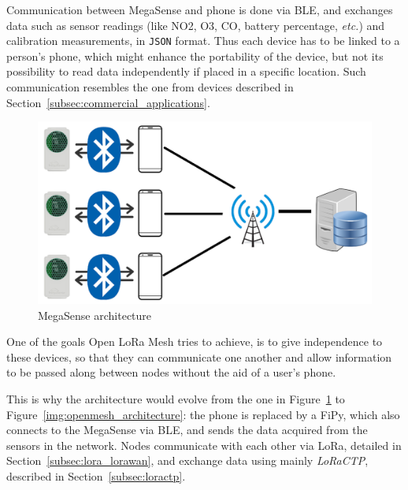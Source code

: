 		Communication between MegaSense and phone is done via BLE, and exchanges data such as sensor readings (like NO2,
		O3, CO, battery percentage, \textit{etc.}) and calibration measurements, in \texttt{JSON} format.
		Thus each device has to be linked to a person's phone, which might enhance the portability of the device, but not its possibility to read data independently if placed in a specific location.
		Such communication resembles the one from devices described in Section~\ref{subsec:commercial_applications}.
		
		\begin{figure}[h]
			\centering
			\includegraphics[width=.75\textwidth]{resources/img/chap5/architecture_megasense}
			\caption{MegaSense architecture}
			\label{img:megasense_architecture}
		\end{figure}
	
		One of the goals Open LoRa Mesh tries to achieve, is to give independence to these devices, so that they can communicate one another and allow information to be passed along between nodes without the aid of a user's phone.
	
		This is why the architecture would evolve from the one in Figure~\ref{img:megasense_architecture} to Figure~\ref{img:openmesh_architecture}: the phone is replaced by a FiPy, which also connects to the MegaSense via BLE, and sends the data acquired from the sensors in the network.
		Nodes communicate with each other via LoRa, detailed in Section~\ref{subsec:lora_lorawan}, and exchange data using mainly \textit{LoRaCTP}, described in Section~\ref{subsec:loractp}.
		
